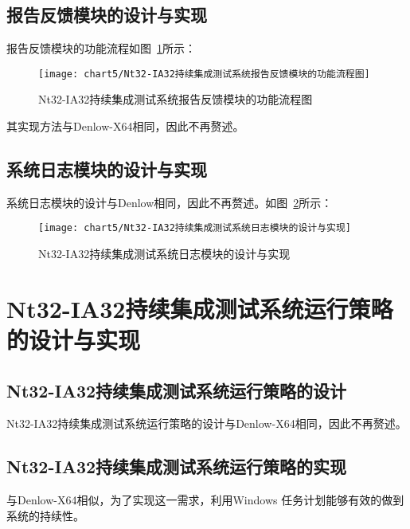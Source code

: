 	\subsection{报告反馈模块的设计与实现}
		
		报告反馈模块的功能流程如图~\ref{fig:Nt32-IA32持续集成测试系统报告反馈模块的功能流程图}所示：
		
		\begin{figure}[H] %
			\centering
			\texttt{[image: chart5/Nt32-IA32持续集成测试系统报告反馈模块的功能流程图]}
			\caption{Nt32-IA32持续集成测试系统报告反馈模块的功能流程图}
			\label{fig:Nt32-IA32持续集成测试系统报告反馈模块的功能流程图}
		\end{figure}
		
		其实现方法与Denlow-X64相同，因此不再赘述。
	
	\subsection{系统日志模块的设计与实现}
		
		系统日志模块的设计与Denlow相同，因此不再赘述。如图~\ref{fig:Nt32-IA32持续集成测试系统日志模块的设计与实现}所示：
		
		\begin{figure}[H] %
			\centering
			\texttt{[image: chart5/Nt32-IA32持续集成测试系统日志模块的设计与实现]}
			\caption{Nt32-IA32持续集成测试系统日志模块的设计与实现}
			\label{fig:Nt32-IA32持续集成测试系统日志模块的设计与实现}
		\end{figure}
		
\section{Nt32-IA32持续集成测试系统运行策略的设计与实现}
	\subsection{Nt32-IA32持续集成测试系统运行策略的设计}
		
		Nt32-IA32持续集成测试系统运行策略的设计与Denlow-X64相同，因此不再赘述。

	\subsection{Nt32-IA32持续集成测试系统运行策略的实现}
		
		与Denlow-X64相似，为了实现这一需求，利用Windows 任务计划能够有效的做到系统的持续性。
		
